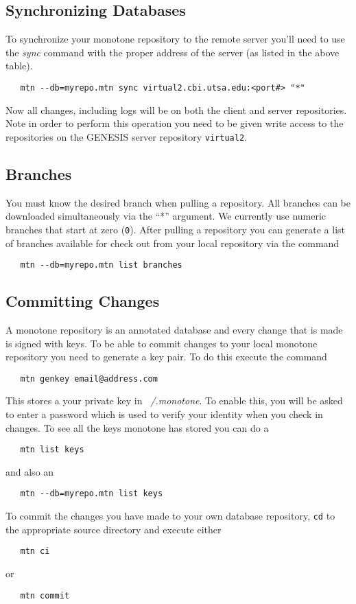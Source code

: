 \documentclass[12pt]{article}
\begin{document}
\subsection*{Synchronizing Databases}

To synchronize your monotone repository to the remote server you'll need to use the {\it sync} command with the proper address of the server (as listed in the above table).
\begin{verbatim}
   mtn --db=myrepo.mtn sync virtual2.cbi.utsa.edu:<port#> "*" 
\end{verbatim}
Now all changes, including logs will be on both the client and server repositories. Note in order to perform this operation you need to be given write access to the repositories on the GENESIS server repository {\tt virtual2}.

\subsection*{Branches}

You must know the desired branch when pulling a repository. All branches can be downloaded simultaneously via the ``*'' argument. We currently use numeric branches that start at zero ({\tt 0}). After pulling a repository you can generate a list of branches available for check out from your local repository via the command
\begin{verbatim}
   mtn --db=myrepo.mtn list branches 
\end{verbatim}

\subsection*{Committing Changes}

A monotone repository is an annotated database and every change that is made is signed with keys. To be able to commit changes to your local monotone repository you need to generate a key pair. To do this execute the command
\begin{verbatim}
   mtn genkey email@address.com 
\end{verbatim}
This stores a your private key in {\it ~/.monotone}. To enable this, you will be asked to enter a password which is used to verify your identity when you check in changes. To see all the keys monotone has stored you can do a
\begin{verbatim}
   mtn list keys 
\end{verbatim}
and also an
\begin{verbatim}
   mtn --db=myrepo.mtn list keys 
\end{verbatim}
To commit the changes you have made to your own database repository, {\tt cd} to the appropriate source directory and execute either
\begin{verbatim}
   mtn ci
\end{verbatim}
or
\begin{verbatim}
   mtn commit 
\end{verbatim}
\end{document}
